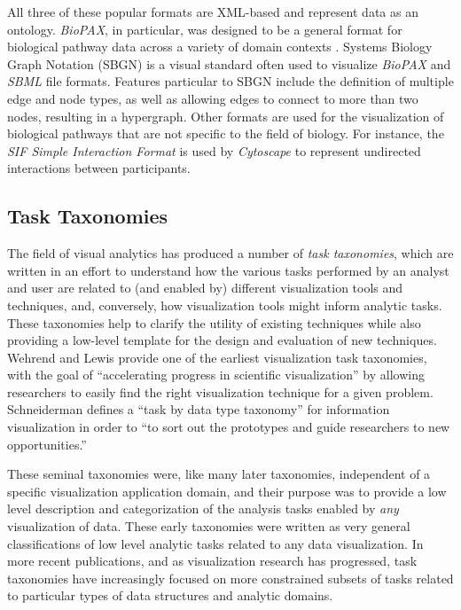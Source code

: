 All three of these popular formats are XML-based and represent data as an ontology.
\emph{BioPAX}, in particular, was designed to be a general format for biological pathway data across a variety of domain contexts \cite{demir2010biopax}.
Systems Biology Graph Notation (SBGN) \cite{Novere2009} is a visual standard often used to visualize \textit{BioPAX} and \textit{SBML} file formats.
Features particular to SBGN include the definition of multiple edge and node types, as well as allowing edges to connect to more than two nodes, resulting in a hypergraph.
Other formats are used for the visualization of biological pathways that are not specific to the field of biology.
For instance, the \textit{SIF Simple Interaction Format} is used by \textit{Cytoscape} \cite{Shannon2003cytoscape} to represent undirected interactions between participants.

\subsection*{Task Taxonomies}

The field of visual analytics has produced a number of \emph{task taxonomies}, which are written in an effort to understand how the various tasks performed by an analyst and user are related to (and enabled by) different visualization tools and techniques, and, conversely, how visualization tools might inform analytic tasks.
These taxonomies help to clarify the utility of existing techniques while also providing a low-level template for the design and evaluation of new techniques.
Wehrend and Lewis \cite{Wehrend1990} provide one of the earliest visualization task taxonomies, with the goal of ``accelerating progress in scientific visualization'' by allowing researchers to easily find the right visualization technique for a given problem.
Schneiderman \cite{Shneiderman1996} defines a ``task by data type taxonomy'' for information visualization in order to ``to sort out the prototypes and guide researchers to new opportunities.''

These seminal taxonomies were, like many later taxonomies, independent of a specific visualization application domain, and their purpose was to provide a low level description and categorization of the analysis tasks enabled by \textit{any} visualization of data.
These early taxonomies were written as very general classifications of low level analytic tasks related to any data visualization.
In more recent publications, and as visualization research has progressed, task taxonomies have increasingly focused on more constrained subsets of tasks related to particular types of data structures and analytic domains.

